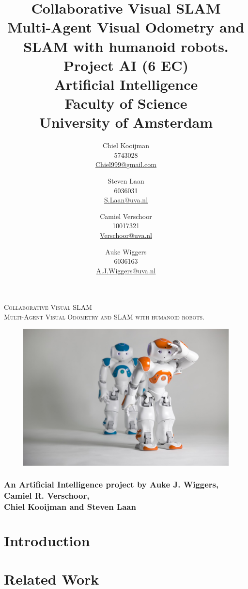 \documentclass[a4paper]{article}
\author{Chiel Kooijman\\5743028\\\url{Chiel999@gmail.com} \and
Steven Laan\\6036031\\\url{S.Laan@uva.nl} \and
Camiel Verschoor\\10017321\\\url{Verschoor@uva.nl} \and
Auke Wiggers\\6036163\\\url{A.J.Wiggers@uva.nl}}
\title{Collaborative Visual SLAM\\\normalsize Multi-Agent Visual Odometry and SLAM with humanoid robots.\\Project AI (6 EC)\\Artificial Intelligence\\Faculty of Science\\University of Amsterdam}
\begin{document}
\thispagestyle{empty}
\begin{center}
\Large\textsc{Collaborative Visual SLAM}\\
\normalsize\textsc{Multi-Agent Visual Odometry and SLAM with humanoid robots.}

\vspace{2cm}

\begin{figure}[!ht]
\centering
\includegraphics[width=\textwidth]{images/front.jpg}
\end{figure}

\subsubsection*{An Artificial Intelligence project by Auke J. Wiggers, Camiel
R. Verschoor,\\Chiel Kooijman and Steven Laan}
\end{center}

\newpage

\thispagestyle{empty}
\mbox{}
\newpage

\maketitle
\clearpage

\thispagestyle{empty}
\tableofcontents
\clearpage

\section{Introduction}

\section{Related Work}
\end{document}
